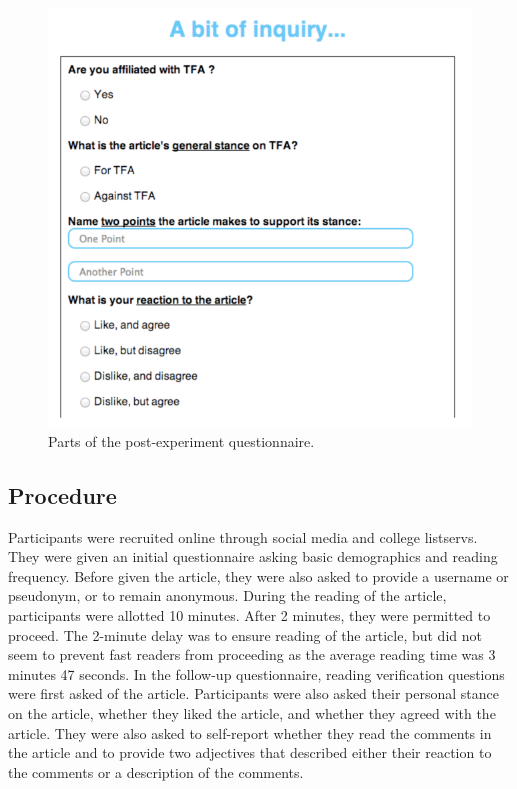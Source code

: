 \begin{figure}
\centering
\includegraphics[scale=0.23]{questionnaire.png} 
\caption{Parts of the post-experiment questionnaire.}
\label{fig:questionnaire}
\end{figure}

\subsection{Procedure}
Participants were recruited online through social media and college listservs. They were given an initial questionnaire asking basic demographics and reading frequency. Before given the article, they were also asked to provide a username or pseudonym, or to remain anonymous. During the reading of the article, participants were allotted 10 minutes. After 2 minutes, they were permitted to proceed. The 2-minute delay was to ensure reading of the article, but did not seem to prevent fast readers from proceeding as the average reading time was 3 minutes 47 seconds. In the follow-up questionnaire, reading verification questions were first asked of the article. Participants were also asked their personal stance on the article, whether they liked the article, and whether they agreed with the article. They were also asked to self-report whether they read the comments in the article and to provide two adjectives that described either their reaction to the comments or a description of the comments.
